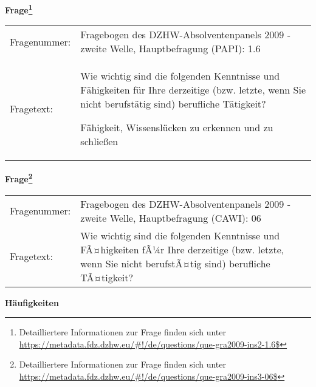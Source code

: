 				\vspace*{0.5cm}
                \noindent\textbf{Frage\footnote{Detailliertere Informationen zur Frage finden sich unter
		              \url{https://metadata.fdz.dzhw.eu/\#!/de/questions/que-gra2009-ins2-1.6$}}}\\
				\begin{tabularx}{\hsize}{@{}lX}
					Fragenummer: &
					  Fragebogen des DZHW-Absolventenpanels 2009 - zweite Welle, Hauptbefragung (PAPI):
					  1.6
 \\
					Fragetext: & Wie wichtig sind die folgenden Kenntnisse und Fähigkeiten für Ihre derzeitige (bzw. letzte, wenn Sie nicht berufstätig sind) berufliche Tätigkeit?\par  Fähigkeit, Wissenslücken zu erkennen und zu schließen \\
				\end{tabularx}
				\vspace*{0.5cm}
                \noindent\textbf{Frage\footnote{Detailliertere Informationen zur Frage finden sich unter
		              \url{https://metadata.fdz.dzhw.eu/\#!/de/questions/que-gra2009-ins3-06$}}}\\
				\begin{tabularx}{\hsize}{@{}lX}
					Fragenummer: &
					  Fragebogen des DZHW-Absolventenpanels 2009 - zweite Welle, Hauptbefragung (CAWI):
					  06
 \\
					Fragetext: & Wie wichtig sind die folgenden Kenntnisse und FÃ¤higkeiten fÃ¼r Ihre derzeitige (bzw. letzte, wenn Sie nicht berufstÃ¤tig sind) berufliche TÃ¤tigkeit? \\
				\end{tabularx}





        		\vspace*{0.5cm}
                \noindent\textbf{Häufigkeiten}

